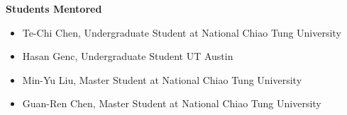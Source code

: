 \documentclass[margin, 9pt]{res} %
\begin{document}
\begin{resume}
\medskip
{\large\textbf{Students Mentored}}\\
\vspace*{-10pt}
\begin{itemize}[leftmargin=*] \itemsep -3pt
\vspace*{-5pt}
\item Te-Chi Chen, Undergraduate Student at National Chiao Tung University
\item Hasan Genc, Undergraduate Student UT Austin
\item Min-Yu Liu, Master Student at National Chiao Tung University
\item Guan-Ren Chen, Master Student at National Chiao Tung University
\end{itemize}

\end{resume}
\end{document}
